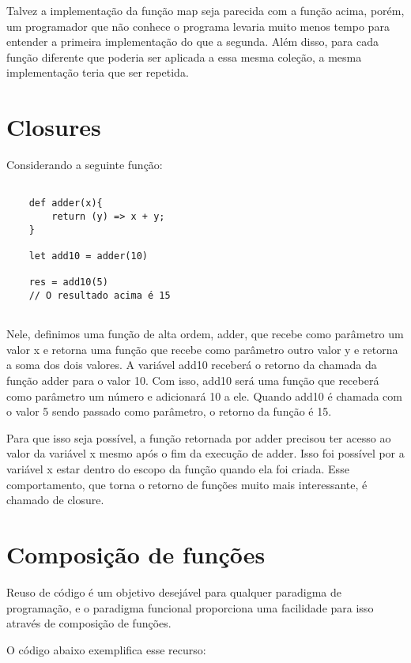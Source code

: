 Talvez a implementação da função map seja parecida 
com a função acima, porém, um programador que não 
conhece o programa levaria muito menos tempo para 
entender a primeira implementação do que a segunda. 
Além disso, para cada função diferente que poderia 
ser aplicada a essa mesma coleção, a mesma 
implementação teria que ser repetida.


\section{Closures}

Considerando a seguinte função:

\begin{lstlisting}[caption={Exemplo de Closure},label=closureex]

    def adder(x){
        return (y) => x + y;
    }

    let add10 = adder(10)

    res = add10(5)
    // O resultado acima é 15


\end{lstlisting}

Nele, definimos uma função de alta ordem, adder, que 
recebe como parâmetro um valor x e retorna uma função 
que recebe como parâmetro outro valor y e retorna a 
soma dos dois valores. A variável add10 receberá 
o retorno da chamada da função adder para o valor 10. 
Com isso, add10 será uma função que receberá como 
parâmetro um número e adicionará 10 a ele. Quando 
add10 é chamada com o valor 5 sendo passado como 
parâmetro, o retorno da função é 15.

Para que isso seja possível, a função retornada por 
adder precisou ter acesso ao valor da variável x mesmo 
após o fim da execução de adder. Isso foi possível 
por a variável x estar dentro do escopo da função 
quando ela foi criada. Esse comportamento, que torna 
o retorno de funções muito mais interessante, é chamado 
de closure.


\section{Composição de funções}

Reuso de código é um objetivo desejável para qualquer 
paradigma de programação, e o paradigma funcional 
proporciona uma facilidade para isso através de 
composição de funções.

O código abaixo exemplifica esse recurso:

